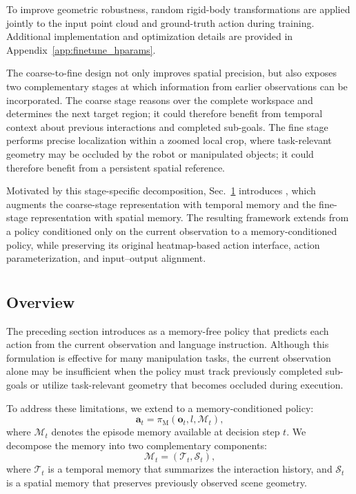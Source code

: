 To improve geometric robustness, random rigid-body transformations are
applied jointly to the input point cloud and ground-truth action during
training.
Additional implementation and optimization details are provided in
Appendix~\ref{app:finetune_hparams}.

The coarse-to-fine design not only improves spatial precision, but also
exposes two complementary stages at which information from earlier
observations can be incorporated.
The coarse stage reasons over the complete workspace and determines the next
target region; it could therefore benefit from temporal context
about previous interactions and completed sub-goals.
The fine stage performs precise localization within a zoomed local crop,
where task-relevant geometry may be occluded by the robot or manipulated
objects; it could therefore benefit from a persistent spatial reference.

Motivated by this stage-specific decomposition, Sec.~\ref{sec:memmethod}
introduces \memmethod, which augments the coarse-stage representation with
temporal memory and the fine-stage representation with spatial memory.
The resulting framework extends \method from a policy conditioned only on
the current observation to a memory-conditioned policy, while preserving
its original heatmap-based action interface, action parameterization, and
input--output alignment.


\section{\memmethod}
\label{sec:memmethod}

\subsection{Overview}
\label{sec:memmethod:formulation}

The preceding section introduces \method as a memory-free policy that
predicts each action from the current observation and language instruction.
Although this formulation is effective for many manipulation tasks, the
current observation alone may be insufficient when the policy must track
previously completed sub-goals or utilize task-relevant geometry that becomes occluded during execution.

To address these limitations, we extend \method to a memory-conditioned
policy:
\begin{equation}
    \mathbf{a}_t
    =
    \pi_{\mathrm{M}}
    \left(
        \mathbf{o}_t,
        l,
        \mathcal{M}_t
    \right),
    \label{eq:mem_policy}
\end{equation}
where $\mathcal{M}_t$ denotes the episode memory available at decision step
$t$.
We decompose the memory into two complementary components:
\begin{equation}
    \mathcal{M}_t
    =
    \left(
        \mathcal{T}_t,
        \mathcal{S}_t
    \right),
    \label{eq:memory_decomposition}
\end{equation}
where $\mathcal{T}_t$ is a temporal memory that summarizes the interaction
history, and $\mathcal{S}_t$ is a spatial memory that preserves previously
observed scene geometry.

